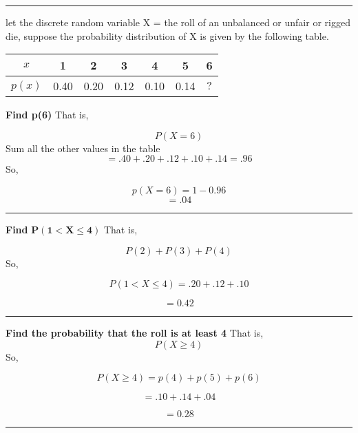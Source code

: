 \documentclass{report}
\begin{document}
  \bigbreak \bigbreak
\hrule
\bigbreak \noindent
\q
\bigbreak \noindent
   let the discrete random variable X = the roll of an unbalanced or unfair or rigged die, suppose the probability distribution of X is given by the following table.
   \bigbreak \noindent
   \begin{center}
\begin{tabular}{c|cccccc}
$x$ & 1 & 2 & 3 & 4 & 5 & 6 \\
\hline$p(x)$ & 0.40 & 0.20 & 0.12 & 0.10 & 0.14 & $?$
\end{tabular}
\end{center}
   \bigbreak \noindent \bigbreak \noindent
   \pagebreak
   \noindent
   \bigbreak \noindent
   \textbf{Find p(6)}
   \bigbreak \noindent
   That is,

   $$ P(X = 6)$$
  Sum all the other values in the table
   $$ = .40 + .20 + .12 + .10 + .14 = .96$$
   So,

   $$ p(X = 6) = 1 - 0.96$$
   $$ = .04$$
   \bigbreak \noindent
   \hrule
   \bigbreak \noindent
   \textbf{Find} $\mathbf{P(1 < X \le 4)}$
  \bigbreak \noindent
  That is,

  $$ P(2) + P(3) + P(4)$$
  So, 

  $$ P(1 < X \le 4) = .20 + .12 + .10$$

  $$ = 0.42$$
  \bigbreak \noindent
  \hrule
  \bigbreak \noindent
  \textbf{Find the probability that the roll is at least 4}
  \bigbreak \noindent
  That is,
  $$ P(X \ge 4)$$
  So,

  $$P(X \ge 4) = p(4) + p(5) + p(6)$$

  $$ = .10 + .14 + .04$$ 

  $$ = 0.28$$
\bigbreak \noindent
\hrule
\bigbreak \noindent
\begin{center}
\end{center}
   \pagebreak
\end{document}
